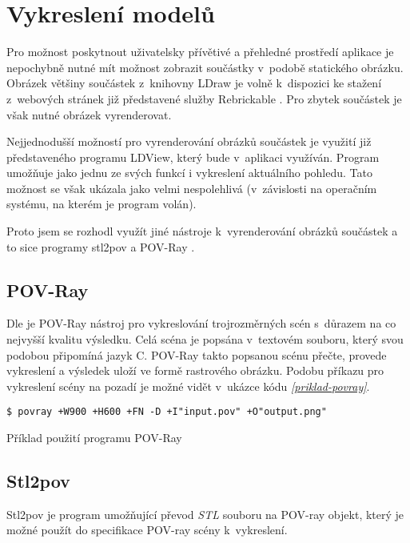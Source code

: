 \section{Vykreslení modelů}\label{reserse-vykresleni}
Pro možnost poskytnout uživatelsky přívětivé a přehledné prostředí aplikace je nepochybně nutné mít možnost zobrazit součástky v~podobě statického obrázku. Obrázek většiny součástek z~knihovny LDraw je volně k~dispozici ke stažení z~webových stránek již představené služby Rebrickable \autocite{rebrickable:download}. Pro zbytek součástek je však nutné obrázek vyrenderovat. 

Nejjednodušší možností pro vyrenderování obrázků součástek je využití již představeného programu LDView, který bude v~aplikaci využíván. Program umožňuje jako jednu ze svých funkcí i vykreslení aktuálního pohledu. Tato možnost se však ukázala jako velmi nespolehlivá (v~závislosti na operačním systému, na kterém je program volán).

Proto jsem se rozhodl využít jiné nástroje k~vyrenderování obrázků součástek a to sice programy stl2pov \autocite{stl2pov} a POV-Ray \autocite{povray}.

\subsection{POV-Ray}
Dle \autocite{root:povray} je POV-Ray nástroj pro vykreslování trojrozměrných scén s~důrazem na co nejvyšší kvalitu výsledku. Celá scéna je popsána v~textovém souboru, který svou podobou připomíná jazyk C. POV-Ray takto popsanou scénu přečte, provede vykreslení a výsledek uloží ve formě rastrového obrázku. Podobu příkazu pro vykreslení scény na pozadí je možné vidět v~ukázce kódu \emph{\ref{priklad-povray}}. 

\begin{listing}[htbp]
        \begin{verbatim}
$ povray +W900 +H600 +FN -D +I"input.pov" +O"output.png" 
        \end{verbatim}
    \caption{Příklad použití programu POV-Ray \label{priklad-povray}}
\end{listing}

\subsection{Stl2pov}
Stl2pov je program umožňující převod \textit{\gls{STL}} souboru na POV-ray objekt, který je možné použít do specifikace POV-ray scény k~vykreslení.  
